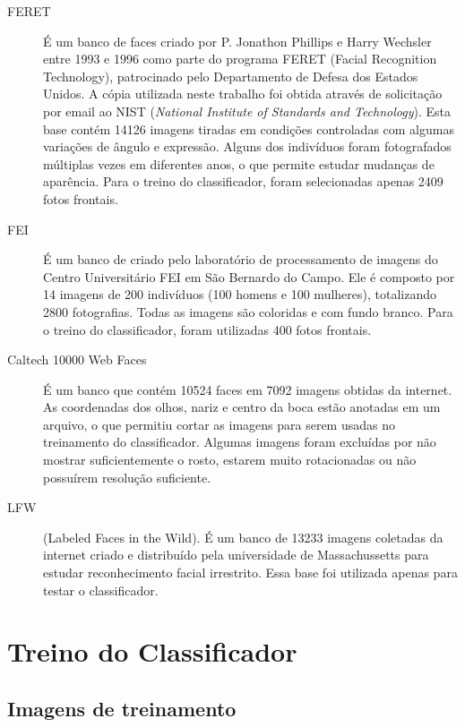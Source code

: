 \begin{description}
\item [FERET] 
É um banco de faces criado por P. Jonathon Phillips e Harry Wechsler entre 1993 e 1996 como parte do programa FERET (Facial Recognition Technology), patrocinado pelo Departamento de Defesa dos Estados Unidos.
A cópia utilizada neste trabalho foi obtida através de solicitação por email ao NIST (\textit{National Institute of Standards and Technology}).
Esta base contém 14126 imagens tiradas em condições controladas com algumas variações de ângulo e expressão.
Alguns dos indivíduos foram fotografados múltiplas vezes em diferentes anos, o que permite estudar mudanças de aparência.
Para o treino do classificador, foram selecionadas apenas 2409 fotos frontais.

\item [FEI]
É um banco de criado pelo laboratório de processamento de imagens do Centro Universitário FEI em São Bernardo do Campo. Ele é composto por 14 imagens de 200 indivíduos (100 homens e 100 mulheres), totalizando 2800 fotografias. Todas as imagens são coloridas e com fundo branco.
Para o treino do classificador, foram utilizadas 400 fotos frontais.

\item [Caltech 10000 Web Faces]
É um banco que contém 10524 faces em 7092 imagens obtidas da internet. As coordenadas dos olhos, nariz e centro da boca estão anotadas em um arquivo, o que permitiu cortar as imagens para serem usadas no treinamento do classificador. Algumas imagens foram excluídas por não mostrar suficientemente o rosto, estarem muito rotacionadas ou não possuírem resolução suficiente.

\item [LFW]
(Labeled Faces in the Wild). É um banco de 13233 imagens coletadas da internet criado e distribuído pela universidade de Massachussetts para estudar reconhecimento facial irrestrito.
Essa base foi utilizada apenas para testar o classificador.
\end{description}


\section{Treino do Classificador}\label{sec:treino_classificador}

\subsection{Imagens de treinamento}\label{sec:imagens_de_treino}


